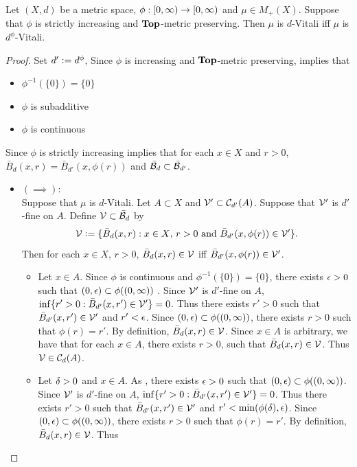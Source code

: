 \documentclass{book}
\begin{document}
	\begin{ex} 
		Let $(X, d)$ be a metric space, $\phi: [0,\infty) \rightarrow [0,\infty)$ and $\mu \in M_+(X)$. Suppose that $\phi$ is strictly increasing and $\operatorname*{\text{\textbf{Top}}}$-metric preserving. Then $\mu$ is $d$-Vitali iff $\mu$ is $d^{\phi}$-Vitali.
	\end{ex}
	
	\begin{proof}
		Set $d' \vcentcolon= d^{\phi}$, Since $\phi$ is increasing and $\operatorname*{\text{\textbf{Top}}}$-metric preserving,  implies that 
		\begin{itemize}
			\item $\phi^{-1}(\{0\}) = \{0\}$
			\item $\phi$ is subadditive
			\item $\phi$ is continuous
		\end{itemize}
		Since $\phi$ is strictly increasing  implies that for each $x \in X$ and $r >0$, $\bar{B}_d(x, r) =  \bar{B}_{d'}(x,\phi(r))$ and $\bar{\mathcal{B}}_d \subset \bar{\mathcal{B}}_{d'}$.
		\begin{itemize}
			\item $(\implies)$: \\
			Suppose that $\mu$ is $d$-Vitali. Let $A \subset X$ and $\mathcal{V}' \subset \mathcal{C}_{d'}(A)$. Suppose that $\mathcal{V}'$ is $d'$-fine on $A$. Define $\mathcal{V} \subset \bar{\mathcal{B}}_d$ by 
			$$\mathcal{V} \vcentcolon= \{\bar{B}_d(x, r): \text{$x \in X$, $r >0$ and $\bar{B}_{d'}(x, \phi(r)) \in \mathcal{V}'$}\}.$$ 
			Then for each $x \in X$, $r > 0$, $\bar{B}_d(x, r) \in \mathcal{V}$ iff $\bar{B}_{d'}(x, \phi(r)) \in \mathcal{V}'$.
			\begin{itemize}
				\item Let $x \in A$. Since $\phi$ is continuous and $\phi^{-1}(\{0\}) = \{0\}$, there exists $\epsilon > 0$ such that $(0, \epsilon) \subset \phi((0, \infty))$ . Since $\mathcal{V}'$ is $d'$-fine on $A$, $\inf \{r' > 0: \bar{B}_{d'}(x, r') \in \mathcal{V}'\} = 0$. Thus there exists $r' > 0$ such that $\bar{B}_{d'}(x, r') \in \mathcal{V}'$ and $r' < \epsilon$. Since $(0, \epsilon) \subset \phi((0, \infty))$, there exists $r > 0$ such that $\phi(r) = r'$. By definition, $\bar{B}_d(x, r) \in \mathcal{V}$. Since $x \in A$ is arbitrary, we have that for each $x \in A$, there exists $r > 0$, such that $\bar{B}_d(x, r) \in \mathcal{V}$. Thus $\mathcal{V} \in \mathcal{C}_d(A)$.
				\item Let $\delta >0$ and $x \in A$. As , there exists $\epsilon > 0$ such that $(0, \epsilon) \subset \phi((0, \infty))$. Since $\mathcal{V}'$ is $d'$-fine on $A$, $\inf \{r' > 0: \bar{B}_{d'}(x, r') \in \mathcal{V}'\} = 0$. Thus there exists $r' > 0$ such that $\bar{B}_{d'}(x, r') \in \mathcal{V}'$ and $r' < \min(\phi(\delta), \epsilon)$. Since $(0, \epsilon) \subset \phi((0, \infty))$, there exists $r > 0$ such that $\phi(r) = r'$. By definition, $\bar{B}_d(x, r) \in \mathcal{V}$. Thus 

\end{itemize}
\end{itemize}
\end{proof}
\end{document}
